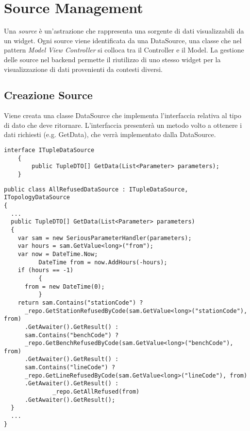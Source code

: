 \section{Source Management}
\label{ch:sms}

Una \textit{source} è un'astrazione che rappresenta una sorgente di dati visualizzabili da un widget. Ogni source viene identificata da una DataSource, una classe che nel pattern \textit{Model View Controller} si colloca tra il Controller e il Model. La gestione delle source nel backend permette il riutilizzo di uno stesso widget per la visualizzazione di dati provenienti da contesti diversi.

\subsection{Creazione Source}
\label{subsec:creazioneSource}
Viene creata una classe DataSource che implementa l’interfaccia relativa al tipo di dato che deve ritornare. L'interfaccia presenterà un metodo volto a ottenere i dati richiesti (e.g. GetData), che verrà implementato dalla DataSource.
\begin{lstlisting}[caption={ITupleDataSource.cs}, style=sharpCode]
interface ITupleDataSource
    {
        public TupleDTO[] GetData(List<Parameter> parameters);
    }
\end{lstlisting}
\begin{lstlisting}[caption={TupleDataSource.cs}, style=sharpCode]
public class AllRefusedDataSource : ITupleDataSource, ITopologyDataSource
{
  ...
  public TupleDTO[] GetData(List<Parameter> parameters)
  {
    var sam = new SeriousParameterHandler(parameters);
    var hours = sam.GetValue<long>("from");
    var now = DateTime.Now;
          DateTime from = now.AddHours(-hours);
    if (hours == -1)
          {
      from = new DateTime(0);
          }
    return sam.Contains("stationCode") ? 
      _repo.GetStationRefusedByCode(sam.GetValue<long>("stationCode"), from)
      .GetAwaiter().GetResult() :
      sam.Contains("benchCode") ? 
      _repo.GetBenchRefusedByCode(sam.GetValue<long>("benchCode"), from)
      .GetAwaiter().GetResult() :
      sam.Contains("lineCode") ?
      _repo.GetLineRefusedByCode(sam.GetValue<long>("lineCode"), from)
      .GetAwaiter().GetResult() :
              _repo.GetAllRefused(from)
      .GetAwaiter().GetResult();
  }
  ...
}
\end{lstlisting}

